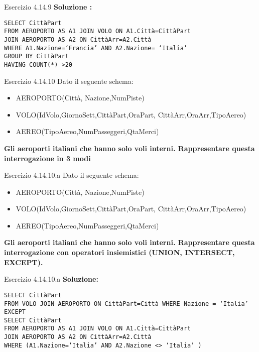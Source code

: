 \begin{frame}{Esercizio 4.14.9}
    \textbf{Soluzione :}
    \vspace{1em}
    
    \texttt{SELECT Citt\`aPart\\FROM AEROPORTO AS A1 JOIN VOLO ON A1.Citt\`a=Citt\`aPart\\JOIN AEROPORTO AS A2 ON Citt\`aArr=A2.Citt\`a\\WHERE A1.Nazione=`Francia' AND A2.Nazione= `Italia'\\GROUP BY Citt\`aPart\\HAVING COUNT(*) >20}
\end{frame}
\begin{frame}{Esercizio 4.14.10}
    Dato il seguente schema:
    \begin{itemize}
        \item AEROPORTO(Citt\`a, Nazione,NumPiste)
        \item VOLO(IdVolo,GiornoSett,Citt\`aPart,OraPart,
        Citt\`aArr,OraArr,TipoAereo)
        \item AEREO(TipoAereo,NumPasseggeri,QtaMerci)
    \end{itemize}
    \vspace{1em}
    
    \textbf{Gli aeroporti italiani che hanno solo voli interni. Rappresentare questa interrogazione in 3 modi}
\end{frame}
%
\begin{frame}{Esercizio 4.14.10.a}
    Dato il seguente schema:
    \begin{itemize}
        \item AEROPORTO(Citt\`a, Nazione,NumPiste)
        \item VOLO(IdVolo,GiornoSett,Citt\`aPart,OraPart,
        Citt\`aArr,OraArr,TipoAereo)
        \item AEREO(TipoAereo,NumPasseggeri,QtaMerci)
    \end{itemize}
    \vspace{1em}
    
    \textbf{Gli aeroporti italiani che hanno solo voli interni. Rappresentare questa interrogazione con operatori insiemistici (UNION, INTERSECT, EXCEPT).}
\end{frame}
\begin{frame}{Esercizio 4.14.10.a}
    \textbf{Soluzione:}
    \vspace{1em}
    
    \texttt{SELECT Citt\`aPart
    \\FROM VOLO JOIN AEROPORTO ON Citt\`aPart=Citt\`a WHERE Nazione = `Italia'
    \\EXCEPT
    \\SELECT Citt\`aPart
    \\FROM AEROPORTO AS A1 JOIN VOLO ON A1.Citt\`a=Citt\`aPart \\JOIN AEROPORTO AS A2 ON Citt\`aArr=A2.Citt\`a
    \\WHERE (A1.Nazione=`Italia' AND A2.Nazione <> `Italia' )}
\end{frame}
